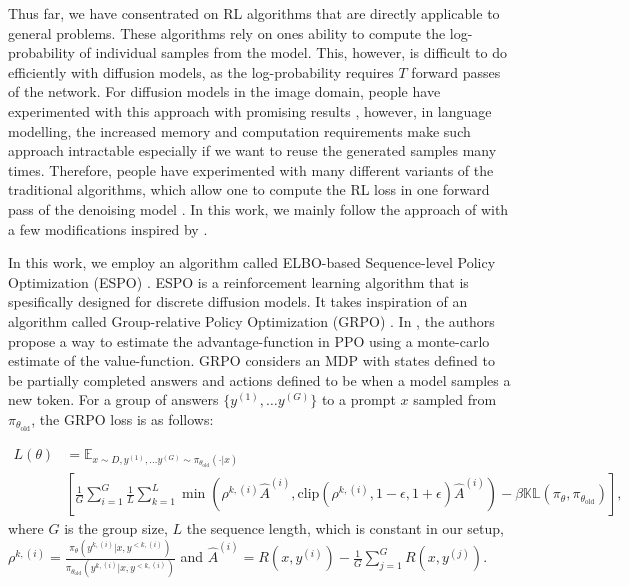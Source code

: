 Thus far, we have consentrated on RL algorithms that are directly applicable to general problems. These algorithms rely on ones ability to compute the log-probability of individual samples from the model. This, however, is difficult to do efficiently with diffusion models, as the log-probability requires $T$ forward passes of the network. For diffusion models in the image domain, people have experimented with this approach with promising results \cite{black2024trainingdiffusionmodelsreinforcement}, however, in language modelling, the increased memory and computation requirements make such approach intractable especially if we want to reuse the generated samples many times. Therefore, people have experimented with many different variants of the traditional algorithms, which allow one to compute the RL loss in one forward pass of the denoising model \cite{rojas2025improvingreasoningdiffusionlanguage, ou2025principledrldiffusionllms, tang2026wd1weightedpolicyoptimization, zhao2025d1scalingreasoningdiffusion}. In this work, we mainly follow the approach of \cite{ou2025principledrldiffusionllms} with a few modifications inspired by \cite{rojas2025improvingreasoningdiffusionlanguage}.

In this work, we employ an algorithm called ELBO-based Sequence-level Policy Optimization (ESPO) \cite{ou2025principledrldiffusionllms}. ESPO is a reinforcement learning algorithm that is spesifically designed for discrete diffusion models. It takes inspiration of an algorithm called Group-relative Policy Optimization (GRPO) \cite{shao2024deepseekmathpushinglimitsmathematical}. In \cite{shao2024deepseekmathpushinglimitsmathematical}, the authors propose a way to estimate the advantage-function in PPO using a monte-carlo estimate of the value-function. GRPO considers an MDP with states defined to be partially completed answers and actions defined to be when a model samples a new token. For a group of answers $\{ y^{(1)}, \dots y^{(G)}\}$ to a prompt $x$ sampled from $\pi_{\theta_\text{old}}$, the GRPO loss is as follows:

\begin{align*}
    L(\theta) &= \mathbb{E}_{x\sim D, y^{(1)},\dots y^{(G)}\sim\pi_{\theta_\text{old}}(\cdot | x)}\\
    &[\frac{1}{G}\sum_{i=1}^{G}\frac{1}{L}\sum_{k=1}^{L}\min(\rho^{k,(i)}\hat{A}^{(i)}, \text{clip}(\rho^{k,(i)}, 1 - \epsilon, 1 + \epsilon)\hat{A}^{(i)}) - \beta\mathbb{KL}(\pi_\theta, \pi_{\theta_\text{old}})],
\end{align*}
where $G$ is the group size, $L$ the sequence length, which is constant in our setup, $\rho^{k,(i)} = \frac{\pi_\theta(y^{k,(i)} | x, y^{<k,(i)})}{\pi_{\theta_\text{old}}(y^{k,(i)} | x, y^{<k,(i)})}$ and $\hat{A}^{(i)} = R(x, y^{(i)}) - \frac{1}{G}\sum_{j=1}^{G}R(x, y^{(j)})$.

